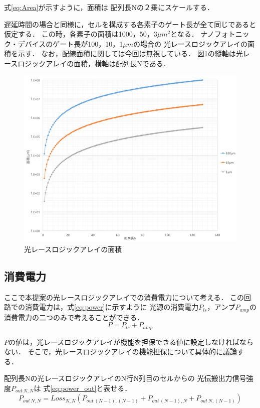 式\ref{eq:Area}が示すように，面積は
配列長Nの２乗にスケールする．

遅延時間の場合と同様に，セルを構成する各素子のゲート長が全て同じであると仮定する．
この時，各素子の面積は1000，50，3$\mu m^2$となる．
ナノフォトニック・デバイスのゲート長が100，10，1$\mu m$の場合の
光レースロジックアレイの面積を示す．
なお，配線面積に関しては今回は無視している．
図\ref{fig:nanoArea}の縦軸は光レースロジックアレイの面積，横軸は配列長Nである．
\begin{figure}[t!]
\begin{center}
\includegraphics[keepaspectratio,scale=0.5]{fig/4/nanoArea.png}
\caption{光レースロジックアレイの面積}
\label{fig:nanoArea}
\end{center}
\end{figure}

\subsection{消費電力}
ここで本提案の光レースロジックアレイでの消費電力について考える．
この回路での消費電力は，式\ref{eq:power}に示すように
$光源の消費電力P_{ls}$，$アンプP_{amp}$の消費電力の二つのみで考えることができる．
\begin{equation}
P=P_{ls}+P_{amp}
\label{eq:power}
\end{equation}

$P$の値は，光レースロジックアレイが機能を担保できる値に設定しなければならない．
そこで，光レースロジックアレイの機能担保について具体的に議論する．

配列長Nの光レースロジックアレイのN行N列目のセルからの
光伝搬出力信号強度$P_{out\,N,N}$は
式\ref{eq:power_out}と表せる．
\begin{equation}
P_{out\,N,N}=Loss_{N,N}(P_{out\,(N-1),(N-1)}+P_{out\,(N-1),N}+P_{out\,N,(N-1)})
\label{eq:power_out}
\end{equation}

